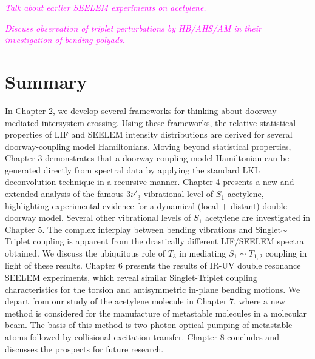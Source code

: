 \documentclass[12pt]{mitthesis}
\newcommand{\POINT}[1]{\textcolor{magenta}{\emph{#1}}}
\begin{document}
\POINT{Talk about earlier SEELEM experiments on acetylene.}

\POINT{Discuss observation of triplet perturbations by HB/AHS/AM in
  their investigation of bending polyads.}

\section{Summary}

In Chapter 2, we develop several frameworks for thinking about
doorway-mediated intersystem crossing.  Using these frameworks, the
relative statistical properties of LIF and SEELEM intensity
distributions are derived for several doorway-coupling model
Hamiltonians.  Moving beyond statistical properties, Chapter 3
demonstrates that a doorway-coupling model Hamiltonian can be
generated directly from spectral data by applying the standard LKL
deconvolution technique in a recursive manner.  Chapter 4 presents a
new and extended analysis of the famous $3\nu'_3$ vibrational level of
$S_1$ acetylene, highlighting experimental evidence for a dynamical
(local $+$ distant) double doorway model.  Several other vibrational
levels of $S_1$ acetylene are investigated in Chapter 5.  The complex
interplay between bending vibrations and Singlet$\sim$Triplet coupling
is apparent from the drastically different LIF/SEELEM spectra
obtained.  We discuss the ubiquitous role of $T_3$ in mediating $S_1
\sim T_{1,2}$ coupling in light of these results.  Chapter 6 presents
the results of IR-UV double resonance SEELEM experiments, which reveal
similar Singlet-Triplet coupling characteristics for the torsion and
antisymmetric in-plane bending motions.  We depart from our study of
the acetylene molecule in Chapter 7, where a new method is considered
for the manufacture of metastable molecules in a molecular beam.  The
basis of this method is two-photon optical pumping of metastable atoms
followed by collisional excitation transfer.  Chapter 8 concludes and
discusses the prospects for future research.
\end{document}
